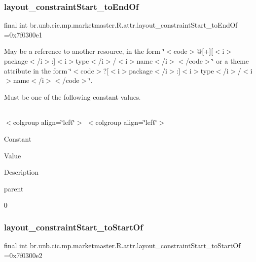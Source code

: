 \subsubsection{\texorpdfstring{layout\+\_\+constraint\+Start\+\_\+to\+End\+Of}{layout\_constraintStart\_toEndOf}}
{\footnotesize\ttfamily final int br.\+unb.\+cic.\+mp.\+marketmaster.\+R.\+attr.\+layout\+\_\+constraint\+Start\+\_\+to\+End\+Of =0x7f0300e1\hspace{0.3cm}{\ttfamily [static]}}

May be a reference to another resource, in the form \char`\"{}$<$code$>$@\mbox{[}+\mbox{]}\mbox{[}$<$i$>$package$<$/i$>$\+:\mbox{]}$<$i$>$type$<$/i$>$/$<$i$>$name$<$/i$>$$<$/code$>$\char`\"{} or a theme attribute in the form \char`\"{}$<$code$>$?\mbox{[}$<$i$>$package$<$/i$>$\+:\mbox{]}$<$i$>$type$<$/i$>$/$<$i$>$name$<$/i$>$$<$/code$>$\char`\"{}. 

Must be one of the following constant values.

\tabulinesep=1mm
\begin{longtabu} spread 0pt [c]{*{0}{|X[-1]}|}
\hline
\end{longtabu}
$<$colgroup align=\char`\"{}left\char`\"{}$>$ $<$colgroup align=\char`\"{}left\char`\"{}$>$ 

Constant

Value

Description 

parent

0\mbox{\label{classbr_1_1unb_1_1cic_1_1mp_1_1marketmaster_1_1R_1_1attr_a47c5b0a50943d20863ae6e8cbea46df5}} 
\subsubsection{\texorpdfstring{layout\+\_\+constraint\+Start\+\_\+to\+Start\+Of}{layout\_constraintStart\_toStartOf}}
{\footnotesize\ttfamily final int br.\+unb.\+cic.\+mp.\+marketmaster.\+R.\+attr.\+layout\+\_\+constraint\+Start\+\_\+to\+Start\+Of =0x7f0300e2\hspace{0.3cm}{\ttfamily [static]}}

